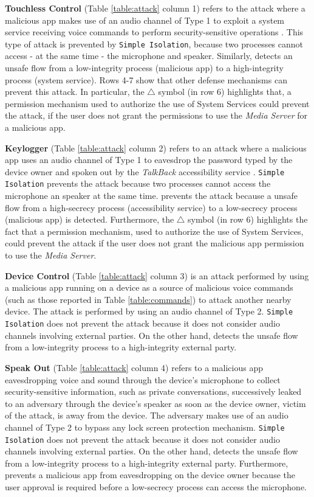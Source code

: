 \textbf{Touchless Control} (Table \ref{table:attack} column 1) refers to the attack where a malicious app makes use of an audio channel of Type 1 to exploit a system service receiving voice commands to perform security-sensitive operations \cite{Jang,Diao}. This type of attack is prevented by \texttt{Simple Isolation}, because two processes cannot access - at the same time - the microphone and speaker. Similarly, \system detects an unsafe flow from a low-integrity process (malicious app) to a high-integrity process (system service). Rows 4-7 show that other defense mechanisms can prevent this attack. In particular, the $\triangle$ symbol (in row 6) highlights that, a permission mechanism used to authorize the use of System Services could prevent the attack, if the user does not grant the permissions to use the {\em Media Server} for a malicious app.

\textbf{Keylogger} (Table \ref{table:attack} column 2) refers to an attack where a malicious app uses an audio channel of Type 1 to eavesdrop the password typed by the device owner and spoken out by the {\em TalkBack} accessibility service \cite{Jang}. \texttt{Simple Isolation} prevents the attack because two processes cannot access the microphone an speaker at the same time. \system prevents the attack because a unsafe flow from a high-secrecy process (accessibility service) to a low-secrecy process (malicious app) is detected. Furthermore, the $\triangle$ symbol (in row 6) highlights the fact that a permission mechanism, used to authorize the use of System Services, could prevent the attack if the user does not grant the malicious app permission to use the {\em Media Server}. 

\textbf{Device Control} (Table \ref{table:attack} column 3) is an attack performed by using a malicious app running on a device as a source of malicious voice commands (such as those reported in Table \ref{table:commands}) to attack another nearby device. The attack is performed by using an audio channel of Type 2. \texttt{Simple Isolation} does not prevent the attack because it does not consider audio channels involving external parties. On the other hand, \system detects the unsafe flow from a low-integrity process to a high-integrity external party. 

\textbf{Speak Out} (Table \ref{table:attack} column 4) refers to a malicious app eavesdropping voice and sound through the device's microphone to collect security-sensitive information, such as private conversations, successively leaked to an adversary through the device's speaker as soon as the device owner, victim of the attack, is away from the device. The adversary makes use of an audio channel of Type 2 to bypass any lock screen protection mechanism. \texttt{Simple Isolation} does not prevent the attack because it does not consider audio channels involving external parties. On the other hand, \system detects the unsafe flow from a low-integrity process to a high-integrity external party. Furthermore, \system prevents a malicious app from eavesdropping on the device owner because the user approval is required before a low-secrecy process can access the microphone.


